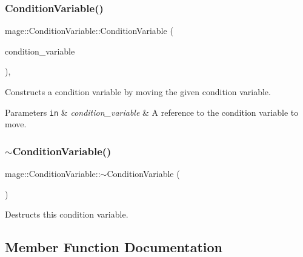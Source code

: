 \subsubsection{\texorpdfstring{Condition\+Variable()}{ConditionVariable()}\hspace{0.1cm}{\footnotesize\ttfamily [3/3]}}
{\footnotesize\ttfamily mage\+::\+Condition\+Variable\+::\+Condition\+Variable (\begin{DoxyParamCaption}\item[{\hyperlink{classmage_1_1_condition_variable}{Condition\+Variable} \&\&}]{condition\+\_\+variable }\end{DoxyParamCaption})\hspace{0.3cm}{\ttfamily [default]}, {\ttfamily [noexcept]}}

Constructs a condition variable by moving the given condition variable.


\begin{DoxyParams}[1]{Parameters}
\mbox{\tt in}  & {\em condition\+\_\+variable} & A reference to the condition variable to move. \\
\hline
\end{DoxyParams}
\hypertarget{classmage_1_1_condition_variable_accd5253beb65b2904428afdb889cf00b}{}\label{classmage_1_1_condition_variable_accd5253beb65b2904428afdb889cf00b} 
\subsubsection{\texorpdfstring{$\sim$\+Condition\+Variable()}{~ConditionVariable()}}
{\footnotesize\ttfamily mage\+::\+Condition\+Variable\+::$\sim$\+Condition\+Variable (\begin{DoxyParamCaption}{ }\end{DoxyParamCaption})}

Destructs this condition variable. 

\subsection{Member Function Documentation}
\hypertarget{classmage_1_1_condition_variable_aab712c41e76c444606d5419a20d87b7a}{}\label{classmage_1_1_condition_variable_aab712c41e76c444606d5419a20d87b7a} 
